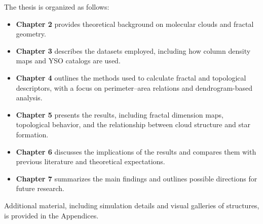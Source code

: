 The thesis is organized as follows:
\begin{itemize}
    \item \textbf{Chapter 2} provides theoretical background on molecular clouds and fractal geometry.
    \item \textbf{Chapter 3} describes the datasets employed, including how column density maps and YSO catalogs are used.
    \item \textbf{Chapter 4} outlines the methods used to calculate fractal and topological descriptors, with a focus on perimeter–area relations and dendrogram-based analysis.
    \item \textbf{Chapter 5} presents the results, including fractal dimension maps, topological behavior, and the relationship between cloud structure and star formation.
    \item \textbf{Chapter 6} discusses the implications of the results and compares them with previous literature and theoretical expectations.
    \item \textbf{Chapter 7} summarizes the main findings and outlines possible directions for future research.
\end{itemize}

Additional material, including simulation details and visual galleries of structures, is provided in the Appendices.
